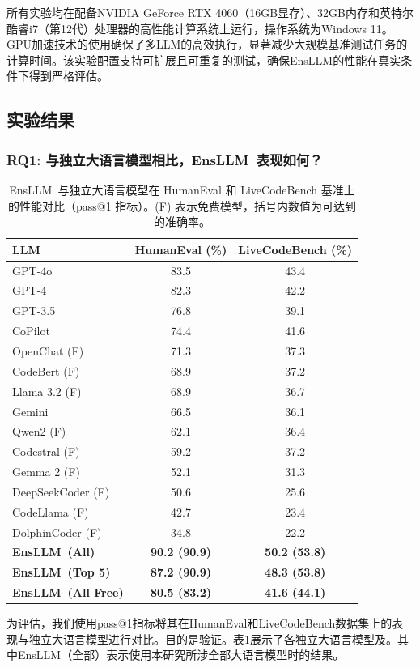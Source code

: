 \documentclass{article}
\newcommand{\tool}{EnsLLM}
\begin{document}
\begin{CJK*}{UTF8}{gbsn}
所有实验均在配备NVIDIA GeForce RTX 4060（16GB显存）、32GB内存和英特尔酷睿i7（第12代）处理器的高性能计算系统上运行，操作系统为Windows 11。GPU加速技术的使用确保了多LLM的高效执行，显著减少大规模基准测试任务的计算时间。该实验配置支持可扩展且可重复的测试，确保\tool 的性能在真实条件下得到严格评估。
\subsection{实验结果}

\subsubsection{RQ1: 与独立大语言模型相比，\tool\ 表现如何？}
\begin{table}[t!]
    \centering
    \caption{\tool\ 与独立大语言模型在 HumanEval 和 LiveCodeBench 基准上的性能对比（pass@1 指标）。(F) 表示免费模型，括号内数值为可达到的准确率。}
    \label{tab:elfcg_performance}
    \begin{tabular}{|l|c|c|}
        \hline
        \textbf{LLM} & \textbf{HumanEval (\%)} & \textbf{LiveCodeBench (\%)} \\
        \hline
        GPT-4o         & 83.5  & 43.4  \\
        GPT-4          & 82.3  & 42.2  \\
        GPT-3.5        & 76.8  & 39.1  \\
        CoPilot        & 74.4  & 41.6  \\
        OpenChat (F)      & 71.3  & 37.3  \\
        CodeBert (F)      & 68.9  & 37.2  \\
        Llama 3.2 (F)     & 68.9  & 36.7  \\
        Gemini         & 66.5  & 36.1  \\
        Qwen2 (F)         & 62.1  & 36.4  \\
        Codestral (F)     & 59.2  & 37.2  \\
        Gemma 2  (F)      & 52.1  & 31.3  \\
        DeepSeekCoder (F)  & 50.6  & 25.6  \\
        CodeLlama  (F)     & 42.7  & 23.4  \\
        DolphinCoder (F)   & 34.8  & 22.2  \\
        \hline
        \textbf{\tool\ (All)} & \textbf{90.2 (90.9)} & \textbf{50.2 (53.8)} \\
        \hline
        \textbf{\tool\ (Top 5)} & \textbf{87.2 (90.9)} & \textbf{48.3 (53.8)} \\
        \hline
        \textbf{\tool\ (All Free)} & \textbf{80.5 (83.2)} & \textbf{41.6 (44.1)} \\
        \hline
    \end{tabular}
\end{table}
\leavevmode\par
为评估，我们使用pass@1指标将其在HumanEval和LiveCodeBench数据集上的表现与独立大语言模型进行对比。目的是验证。表\ref{tab:elfcg_performance}展示了各独立大语言模型及。其中\tool（全部）表示使用本研究所涉全部大语言模型时的结果。


\end{CJK*}
\end{document}

